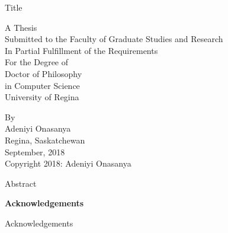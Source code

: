 \documentclass[12pt]{report}
\begin{document}
\begin{titlepage}
    \begin{center}
    \begin{doublespace}
        \vspace*{3cm}

        \large
        Title

        \vspace{1cm}

        \large
        A Thesis\\
        Submitted to the Faculty of Graduate Studies and Research\\
        In Partial Fulfillment of the Requirements\\
        For the Degree of\\
        Doctor of Philosophy\\
        in Computer Science\\
        University of Regina\\

        \vspace{0.8cm}

        \normalsize
        By\\
        Adeniyi Onasanya\\
        Regina, Saskatchewan\\
        September, 2018\\

        \vspace{0.8cm}
        \textcopyright \hspace*{0.2cm} Copyright 2018: Adeniyi Onasanya
    \end{doublespace}
    \end{center}
\end{titlepage}

\abstract{}
\begin{doublespace}

Abstract

\end{doublespace}
\newpage

\begin{doublespace}
\begin{center}
\textbf{Acknowledgements}
\end{center}

Acknowledgements

\end{doublespace}
\newpage
\end{document}
